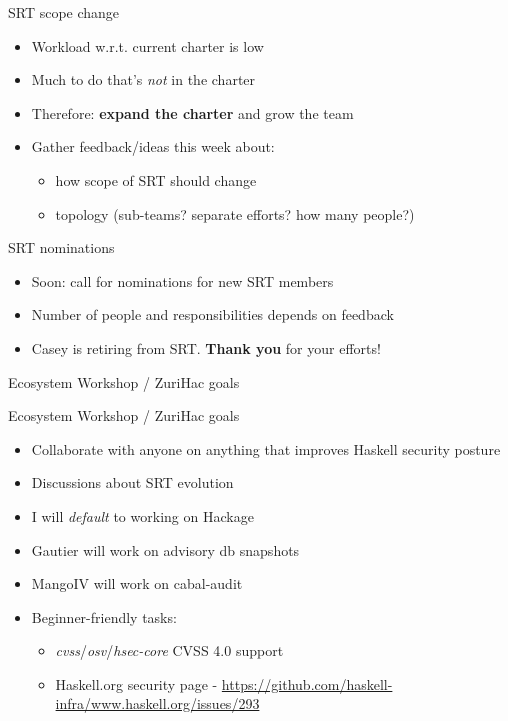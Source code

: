 \documentclass[ignorenonframetext,aspectratio=169,12pt]{beamer}
\begin{document}
\begin{frame}{SRT scope change}
  \begin{itemize}
    \item Workload w.r.t. current charter is low
    \item Much to do that's {\em not} in the charter
    \item Therefore: {\bf expand the charter} and grow the team

    \item Gather feedback/ideas this week about:
        \begin{itemize}
          \item how scope of SRT should change
          \item topology (sub-teams? separate efforts? how many
            people?)
        \end{itemize}

  \end{itemize}
\end{frame}

\begin{frame}{SRT nominations}
  \begin{itemize}
    \item Soon: call for nominations for new SRT members
    \item Number of people and responsibilities depends on feedback
    \item Casey is retiring from SRT.  {\bf Thank you} for your efforts!
  \end{itemize}
\end{frame}


\begin{frame}
\centering
\Large
  Ecosystem Workshop / ZuriHac goals
\end{frame}

\begin{frame}{Ecosystem Workshop / ZuriHac goals}
  \begin{itemize}
    \item Collaborate with anyone on anything that improves
      Haskell security posture
    \item Discussions about SRT evolution
    \item I will {\em default} to working on Hackage
    \item Gautier will work on advisory db snapshots
    \item MangoIV will work on cabal-audit
    \item Beginner-friendly tasks:
      \begin{itemize}
        \item {\em cvss}/{\em osv}/{\em hsec-core} CVSS 4.0 support
        \item Haskell.org security page -
          \url{https://github.com/haskell-infra/www.haskell.org/issues/293}
      \end{itemize}
  \end{itemize}
\end{frame}
\end{document}
